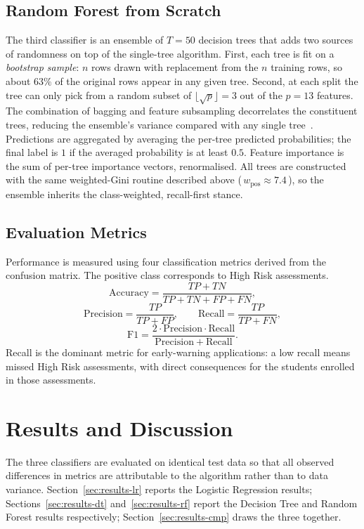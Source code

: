 \documentclass[conference]{IEEEtran}
\begin{document}
\subsection{Random Forest from Scratch}
The third classifier is an ensemble of $T = 50$ decision trees that adds two sources of randomness on top of the single-tree algorithm. First, each tree is fit on a \emph{bootstrap sample}: $n$ rows drawn with replacement from the $n$ training rows, so about $63\%$ of the original rows appear in any given tree. Second, at each split the tree can only pick from a random subset of $\lfloor\sqrt{p}\rfloor = 3$ out of the $p = 13$ features. The combination of bagging and feature subsampling decorrelates the constituent trees, reducing the ensemble's variance compared with any single tree~\cite{breiman2001rf}. Predictions are aggregated by averaging the per-tree predicted probabilities; the final label is $1$ if the averaged probability is at least $0.5$. Feature importance is the sum of per-tree importance vectors, renormalised. All trees are constructed with the same weighted-Gini routine described above (\,$w_{\mathrm{pos}} \approx 7.4$\,), so the ensemble inherits the class-weighted, recall-first stance.

\subsection{Evaluation Metrics}
Performance is measured using four classification metrics derived from the confusion matrix. The positive class corresponds to High Risk assessments.
\begin{equation}
\mathrm{Accuracy} = \frac{TP+TN}{TP+TN+FP+FN},
\end{equation}
\begin{equation}
\mathrm{Precision} = \frac{TP}{TP+FP},
\qquad
\mathrm{Recall} = \frac{TP}{TP+FN},
\end{equation}
\begin{equation}
\mathrm{F1} = \frac{2 \cdot \mathrm{Precision} \cdot \mathrm{Recall}}{\mathrm{Precision} + \mathrm{Recall}}.
\end{equation}
Recall is the dominant metric for early-warning applications: a low recall means missed High Risk assessments, with direct consequences for the students enrolled in those assessments.

\section{Results and Discussion}
The three classifiers are evaluated on identical test data so that all observed differences in metrics are attributable to the algorithm rather than to data variance. Section~\ref{sec:results-lr} reports the Logistic Regression results; Sections~\ref{sec:results-dt} and~\ref{sec:results-rf} report the Decision Tree and Random Forest results respectively; Section~\ref{sec:results-cmp} draws the three together.
\end{document}

